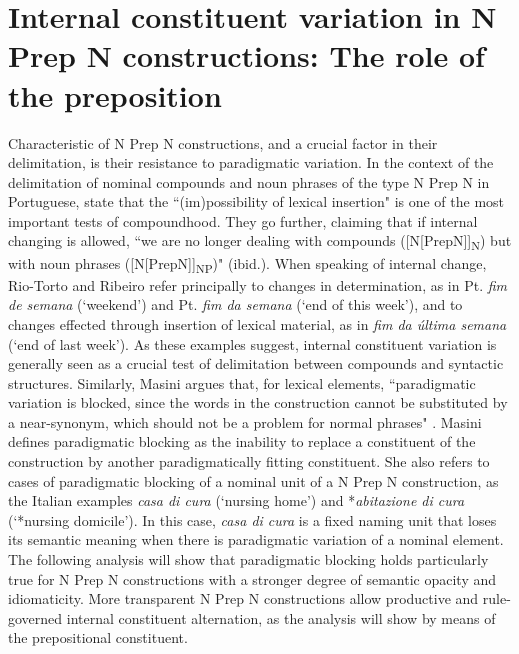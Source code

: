 \documentclass[output=paper]{langsci/langscibook}
\begin{document}
\section{Internal constituent variation in N Prep N constructions: The role of the preposition} 
Characteristic of N Prep N constructions, and a crucial factor in their delimitation, is their resistance to paradigmatic variation. In the context of the delimitation of nominal compounds and noun phrases of the type N Prep N in Portuguese, \citet[9]{RioTorto:2012} state that the ``(im)possibility of lexical insertion" is one of the most important tests of compoundhood. They go further, claiming that if internal changing is allowed, ``we are no longer dealing with compounds ([N[PrepN]]\textsubscript{N})  but with noun phrases ([N[PrepN]]\textsubscript{NP})" (ibid.). When speaking of internal change, Rio-Torto and Ribeiro refer principally to changes in determination, as in Pt. \textit{fim de semana} (`weekend') and Pt. \textit{fim da semana} (`end of this week'), and to changes effected through insertion of lexical material, as in \textit{fim da última semana} (`end of last week'). As these examples suggest, internal constituent variation is generally seen as a crucial test of delimitation between compounds and syntactic structures. Similarly, Masini argues that, for lexical elements, ``paradigmatic variation is blocked, since the words in the construction cannot be substituted by a near-synonym, which should not be a problem for normal phrases" \citep[259]{Masini:2009}. Masini defines paradigmatic blocking as the inability to replace a constituent of the construction by another paradigmatically fitting constituent. She also refers to cases of paradigmatic blocking of a nominal unit of a N Prep N construction, as the Italian examples \textit{casa di cura} (`nursing home') and *\textit{abitazione di cura} (`*nursing domicile'). In this case, \textit{casa di cura} is a fixed naming unit that loses its semantic meaning when there is paradigmatic variation of a nominal element. The following analysis will show that paradigmatic blocking holds particularly true for N Prep N constructions with a stronger degree of semantic opacity and idiomaticity. More transparent N Prep N constructions allow productive and rule-governed internal constituent alternation, as the analysis will show by means of the prepositional constituent.
 
\end{document}
